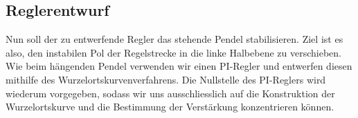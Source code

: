 \documentclass[a4paper,11pt]{scrartcl}
\begin{document}
\begin{answerboxfillpage}\end{answerboxfillpage}

\begin{answerbox}[9]\end{answerbox}

\subsection*{Reglerentwurf}

Nun soll der zu entwerfende Regler das stehende Pendel stabilisieren. Ziel ist es also, den instabilen Pol der Regelstrecke in die linke Halbebene zu verschieben. Wie beim hängenden Pendel verwenden wir einen PI-Regler und entwerfen diesen mithilfe des Wurzelortskurvenverfahrens. Die Nullstelle des PI-Reglers wird wiederum vorgegeben, sodass wir uns ausschliesslich auf die Konstruktion der Wurzelortskurve und die Bestimmung der Verstärkung konzentrieren können.
\end{document}
